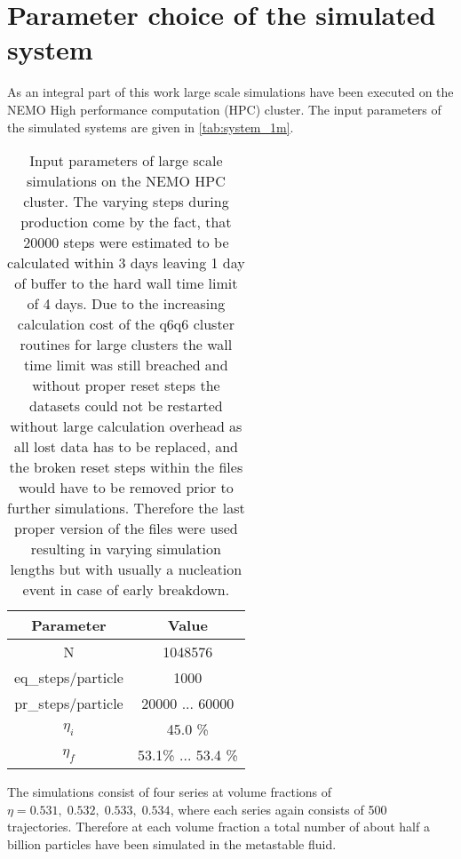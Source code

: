 
\label{chp:data_analysis}
\section{Parameter choice of the simulated system}
\label{sec:system_choice}
As an integral part of this work large scale simulations have been executed on the NEMO High performance computation (HPC) cluster. The input parameters of the simulated systems are given in \autoref{tab:system_1m}.

\begin{table}[ht]
\centering
\begin{tabular}{c|c}
Parameter & Value \\ \hline
N & 1048576 \\
eq\_steps/particle & 1000 \\
pr\_steps/particle & 20000  ... 60000 \\
$\eta_i$ & 45.0 \% \\
$\eta_f$ & 53.1\% ... 53.4 \% \\
\end{tabular}
\caption[Simulation parameters of data production systems]{Input parameters of large scale simulations on the NEMO HPC cluster. The varying steps during production come by the fact, that 20000 steps were estimated to be calculated within 3 days leaving 1 day of buffer to the hard wall time limit of 4 days. Due to the increasing calculation cost of the q6q6 cluster routines for large clusters the wall time limit was still breached and without proper reset steps the datasets could not be restarted without large calculation overhead as all lost data has to be replaced, and the broken reset steps within the files would have to be removed prior to further simulations. Therefore the last proper version of the files were used resulting in varying simulation lengths but with usually a nucleation event in case of early breakdown.}
\label{tab:system_1m}
\end{table}

The simulations consist of four series at volume fractions of $\eta = 0.531,\;0.532,\;0.533,\;0.534$, where each series again consists of 500 trajectories. Therefore at each volume fraction a total number of about half a billion particles have been simulated in the metastable fluid.\\

